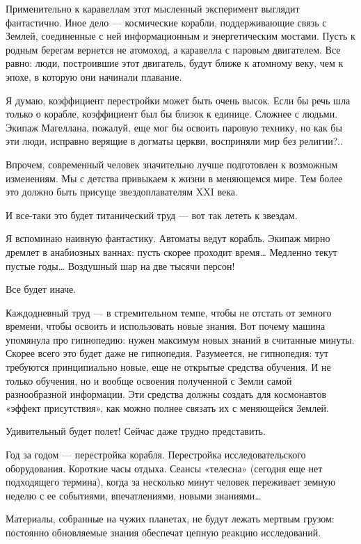 Применительно   к   каравеллам   этот   мысленный   эксперимент   выглядит
фантастично. Иное  дело  —  космические корабли,  поддерживающие  связь  с
Землей, соединенные с ней информационным и энергетическим мостами. Пусть к
родным берегам вернется не атомоход, а каравелла с паровым двигателем. Все
равно: люди, построившие этот двигатель, будут ближе к атомному веку,  чем
к эпохе, в которую они начинали плавание.

Я думаю, коэффициент перестройки может быть очень высок. Если бы речь  шла
только о корабле, коэффициент был бы  близок к единице. Сложнее с  людьми.
Экипаж Магеллана, пожалуй, еще мог бы  освоить паровую технику, но как  бы
эти люди, исправно верящие в догматы церкви, восприняли мир без религии?..

Впрочем, современный  человек значительно  лучше подготовлен  к  возможным
изменениям. Мы с детства  привыкаем к жизни в  меняющемся мире. Тем  более
это должно быть присуще звездоплавателям XXI века.

И все-таки это будет титанический труд — вот так лететь к звездам.

Я вспоминаю  наивную  фантастику.  Автоматы ведут  корабль.  Экипаж  мирно
дремлет в анабиозных ваннах: пусть  скорее проходит время… Медленно  текут
пустые годы… Воздушный шар на две тысячи персон!

Все будет иначе.

Каждодневный труд —  в стремительном  темпе, чтобы не  отстать от  земного
времени, чтобы  освоить и  использовать новые  знания. Вот  почему  машина
упомянула про гипнопедию: нужен максимум новых знаний в считанные  минуты.
Скорее всего это будет даже не гипнопедия. Разумеется, не гипнопедия:  тут
требуются принципиально новые,  еще не  открытые средства  обучения. И  не
только  обучения,  но   и  вообще  освоения   полученной  с  Земли   самой
разнообразной информации.  Эти  средства должны  создать  для  космонавтов
«эффект присутствия», как можно полнее связать их с меняющейся Землей.

Удивительный будет полет! Сейчас даже трудно представить.

Год  за  годом  —  перестройка  корабля.  Перестройка   исследовательского
оборудования. Короткие  часы отдыха.  Сеансы  «телесна» (сегодня  еще  нет
подходящего термина), когда за  несколько минут человек переживает  земную
неделю с ее событиями, впечатлениями, новыми знаниями…

Материалы, собранные на  чужих планетах, не  будут лежать мертвым  грузом:
постоянно обновляемые знания обеспечат цепную реакцию исследований.

